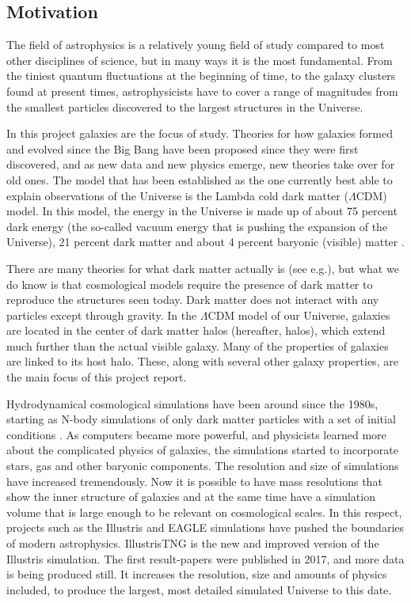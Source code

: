 
\noindent
\subsection{Motivation}
The field of astrophysics is a relatively young field of study compared to most other disciplines of science, but in many ways it is the most fundamental. From the tiniest quantum fluctuations at the beginning of time, to the galaxy clusters found at present times, astrophysicists have to cover a range of magnitudes from the smallest particles discovered to the largest structures in the Universe. 

In this project galaxies are the focus of study. Theories for how galaxies formed and evolved since the Big Bang have been proposed since they were first discovered, and as new data and new physics emerge, new theories take over for old ones. The model that has been established as the one currently best able to explain observations of the Universe is the Lambda cold dark matter ($\Lambda$CDM) model. In this model, the energy in the Universe is made up of about 75 percent dark energy (the so-called vacuum energy that is pushing the expansion of the Universe), 21 percent dark matter and about 4 percent baryonic (visible) matter \parencite{Planck2015}. 

There are many theories for what dark matter actually is (see e.g.\cite{Boveia2018}), but what we do know is that cosmological models require the presence of dark matter to reproduce the structures seen today. Dark matter does not interact with any particles except through gravity. In the $\Lambda$CDM model of our Universe, galaxies are located in the center of dark matter halos (hereafter, halos), which extend much further than the actual visible galaxy. Many of the properties of galaxies are linked to its host halo. These, along with several other galaxy properties, are the main focus of this project report.

Hydrodynamical cosmological simulations have been around since the 1980s, starting as N-body simulations of only dark matter particles with a set of initial conditions \parencite{Frenk1983}. As computers became more powerful, and physicists learned more about the complicated physics of galaxies, the simulations started to incorporate stars, gas and other baryonic components. The resolution and size of simulations have increased tremendously. Now it is possible to have mass resolutions that show the inner structure of galaxies and at the same time have a simulation volume that is large enough to be relevant on cosmological scales. In this respect, projects such as the Illustris and EAGLE simulations have pushed the boundaries of modern astrophysics. IllustrisTNG is the new and improved version of the Illustris simulation. The first result-papers were published in 2017, and more data is being produced still. It increases the resolution, size and amounts of physics included, to produce the largest, most detailed simulated Universe to this date. 

